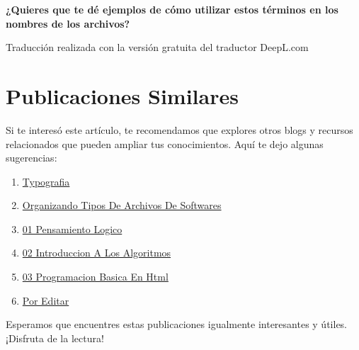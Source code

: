 \documentclass[
  stu,
  floatsintext,
  longtable,
  a4paper,
  nolmodern,
  notxfonts,
  notimes,
  colorlinks=true,linkcolor=blue,citecolor=blue,urlcolor=blue]{apa7}
\providecommand{\tightlist}{%
  \setlength{\itemsep}{0pt}\setlength{\parskip}{0pt}}
\begin{document}
\textbf{¿Quieres que te dé ejemplos de cómo utilizar estos términos en
los nombres de los archivos?}

Traducción realizada con la versión gratuita del traductor DeepL.com

\section{Publicaciones Similares}\label{publicaciones-similares}

Si te interesó este artículo, te recomendamos que explores otros blogs y
recursos relacionados que pueden ampliar tus conocimientos. Aquí te dejo
algunas sugerencias:

\begin{enumerate}
\def\labelenumi{\arabic{enumi}.}
\tightlist
\item
  \href{https://achalmaedison.netlify.app/programacion-software/fundamentos-programacion/2018-06-09-typografia/index.pdf}{}
  \href{https://achalmaedison.netlify.app/programacion-software/fundamentos-programacion/2018-06-09-typografia}{Typografia}
\item
  \href{https://achalmaedison.netlify.app/programacion-software/fundamentos-programacion/2019-08-13-organizando-tipos-de-archivos-de-softwares/index.pdf}{}
  \href{https://achalmaedison.netlify.app/programacion-software/fundamentos-programacion/2019-08-13-organizando-tipos-de-archivos-de-softwares}{Organizando
  Tipos De Archivos De Softwares}
\item
  \href{https://achalmaedison.netlify.app/programacion-software/fundamentos-programacion/2021-01-04-01-pensamiento-logico/index.pdf}{}
  \href{https://achalmaedison.netlify.app/programacion-software/fundamentos-programacion/2021-01-04-01-pensamiento-logico}{01
  Pensamiento Logico}
\item
  \href{https://achalmaedison.netlify.app/programacion-software/fundamentos-programacion/2021-01-11-02-introduccion-a-los-algoritmos/index.pdf}{}
  \href{https://achalmaedison.netlify.app/programacion-software/fundamentos-programacion/2021-01-11-02-introduccion-a-los-algoritmos}{02
  Introduccion A Los Algoritmos}
\item
  \href{https://achalmaedison.netlify.app/programacion-software/fundamentos-programacion/2021-01-18-03-programacion-basica-en-html/index.pdf}{}
  \href{https://achalmaedison.netlify.app/programacion-software/fundamentos-programacion/2021-01-18-03-programacion-basica-en-html}{03
  Programacion Basica En Html}
\item
  \href{https://achalmaedison.netlify.app/programacion-software/fundamentos-programacion/2024-03-31-por-editar/index.pdf}{}
  \href{https://achalmaedison.netlify.app/programacion-software/fundamentos-programacion/2024-03-31-por-editar}{Por
  Editar}
\end{enumerate}

Esperamos que encuentres estas publicaciones igualmente interesantes y
útiles. ¡Disfruta de la lectura!
\end{document}
